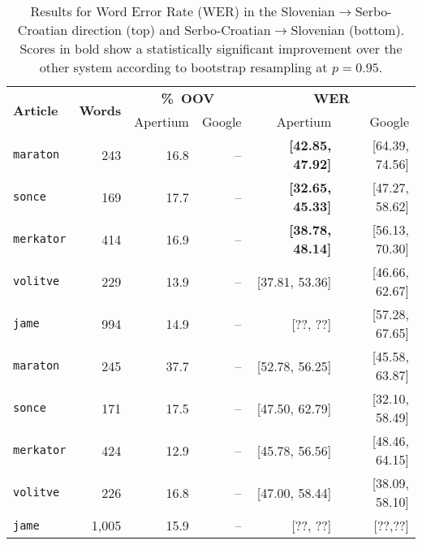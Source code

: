 

\begin{table*}
\begin{center}
\begin{tabular}{|l|r|rr||rr|}
   \hline
  \multirow{2}{*}{\textbf{Article}}  & \multirow{2}{*}{\textbf{Words}} & \multicolumn{2}{|c||}{\textbf{\%~OOV}} & \multicolumn{2}{c|}{\textbf{WER}}\\\cline{3-6}
                    &                & Apertium & Google &  Apertium & Google \\
   \hline
   \hline
  \texttt{maraton}  & 243            & 16.8     & --     & \textbf{[42.85, 47.92]} & [64.39, 74.56] \\
  \texttt{sonce}    & 169            & 17.7     & --     & \textbf{[32.65, 45.33]}    & [47.27, 58.62] \\
  \texttt{merkator} & 414            & 16.9     & --     & \textbf{[38.78, 48.14]}     & [56.13, 70.30] \\
  \texttt{volitve}  & 229            & 13.9     & --     & [37.81, 53.36]      & [46.66, 62.67] \\
  \texttt{jame}     & 994            & 14.9     & --     & [??, ??]      & [57.28, 67.65] \\
  \hline
  \hline
  \texttt{maraton}  & 245            & 37.7     & --     & [52.78, 56.25]           & [45.58, 63.87]\\
  \texttt{sonce}    & 171            & 17.5     & --     & [47.50, 62.79]    & [32.10, 58.49] \\
  \texttt{merkator} & 424            & 12.9     & --     & [45.78, 56.56]    & [48.46, 64.15] \\
  \texttt{volitve}  & 226            & 16.8     & --     & [47.00, 58.44]    & [38.09, 58.10]\\
  \texttt{jame}     & 1,005          & 15.9     & --     & [??, ??]              & [??,??]\\

  \hline
\end{tabular}
 \caption{Results for Word Error Rate (WER) in the Slovenian$\rightarrow$Serbo-Croatian direction (top) and Serbo-Croatian$\rightarrow$Slovenian (bottom). Scores in bold show a statistically significant improvement over the other system according to bootstrap resampling at $p = 0.95$.}
\label{table:quantitative1}
\end{center}
\end{table*}


